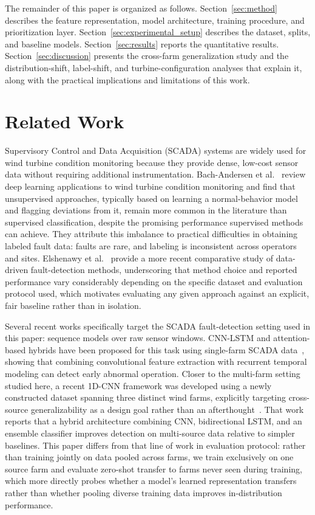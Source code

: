 \documentclass[conference]{IEEEtran}
\begin{document}
The remainder of this paper is organized as follows.
Section~\ref{sec:method} describes the feature representation, model
architecture, training procedure, and prioritization layer.
Section~\ref{sec:experimental_setup} describes the dataset, splits, and
baseline models. Section~\ref{sec:results} reports the quantitative
results. Section~\ref{sec:discussion} presents the cross-farm
generalization study and the distribution-shift, label-shift, and
turbine-configuration analyses that explain it, along with the practical
implications and limitations of this work.
 

\section{Related Work}
Supervisory Control and Data Acquisition (SCADA) systems are widely used
for wind turbine condition monitoring because they provide dense,
low-cost sensor data without requiring additional instrumentation.
Bach-Andersen et al.~\cite{bachandersen2018} review deep learning
applications to wind turbine condition monitoring and find that
unsupervised approaches, typically based on learning a normal-behavior
model and flagging deviations from it, remain more common in the
literature than supervised classification, despite the promising
performance supervised methods can achieve. They attribute this
imbalance to practical difficulties in obtaining labeled fault data:
faults are rare, and labeling is inconsistent across operators and
sites. Elshenawy et al.~\cite{elshenawy2024} provide a more recent
comparative study of data-driven fault-detection methods, underscoring
that method choice and reported performance vary considerably depending
on the specific dataset and evaluation protocol used, which motivates
evaluating any given approach against an explicit, fair baseline rather
than in isolation.
 
Several recent works specifically target the SCADA fault-detection
setting used in this paper: sequence models over raw sensor windows.
CNN-LSTM and attention-based hybrids have been proposed for this task
using single-farm SCADA data~\cite{cnnlstm2021}, showing that combining
convolutional feature extraction with recurrent temporal modeling can
detect early abnormal operation. Closer to the multi-farm setting
studied here, a recent 1D-CNN framework was developed using a newly
constructed dataset spanning three distinct wind farms, explicitly
targeting cross-source generalizability as a design goal rather than an
afterthought~\cite{cnn1d_multisource}. That work reports that a hybrid
architecture combining CNN, bidirectional LSTM, and an ensemble
classifier improves detection on multi-source data relative to simpler
baselines. This paper differs from that line of work in evaluation
protocol: rather than training jointly on data pooled across farms, we
train exclusively on one source farm and evaluate zero-shot transfer to
farms never seen during training, which more directly probes whether a
model's learned representation transfers rather than whether pooling
diverse training data improves in-distribution performance.
 
\end{document}

